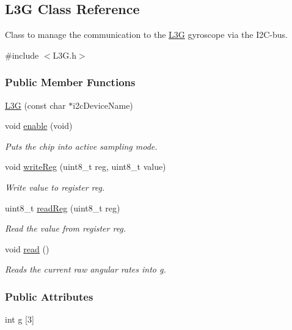 \hypertarget{class_l3_g}{\subsection{\-L3\-G \-Class \-Reference}
\label{class_l3_g}
}


\-Class to manage the communication to the \hyperlink{class_l3_g}{\-L3\-G} gyroscope via the \-I2\-C-\/bus.  




{\ttfamily \#include $<$\-L3\-G.\-h$>$}

\subsubsection*{\-Public \-Member \-Functions}
\begin{DoxyCompactItemize}
\item 
\hyperlink{class_l3_g_a98c77b59983763302f3b9fde5b284a33}{\-L3\-G} (const char $\ast$i2c\-Device\-Name)
\item 
void \hyperlink{class_l3_g_a48decd4910020dc16c219e0081239c45}{enable} (void)
\begin{DoxyCompactList}\small\item\em \-Puts the chip into active sampling mode. \end{DoxyCompactList}\item 
void \hyperlink{class_l3_g_a6ab0e9d8b8349eb08ba97432660c258e}{write\-Reg} (uint8\-\_\-t reg, uint8\-\_\-t value)
\begin{DoxyCompactList}\small\item\em \-Write value to register reg. \end{DoxyCompactList}\item 
uint8\-\_\-t \hyperlink{class_l3_g_a5791e06a4e63a54300716780818ed726}{read\-Reg} (uint8\-\_\-t reg)
\begin{DoxyCompactList}\small\item\em \-Read the value from register reg. \end{DoxyCompactList}\item 
void \hyperlink{class_l3_g_a4b1913429824dc07bd2017c3755e7985}{read} ()
\begin{DoxyCompactList}\small\item\em \-Reads the current raw angular rates into \hyperlink{class_l3_g_a0cb874e50a2ea4753d81e9a46c7e45ce}{g}. \end{DoxyCompactList}\end{DoxyCompactItemize}
\subsubsection*{\-Public \-Attributes}
\begin{DoxyCompactItemize}
\item 
int \hyperlink{class_l3_g_a0cb874e50a2ea4753d81e9a46c7e45ce}{g} \mbox{[}3\mbox{]}
\end{DoxyCompactItemize}


